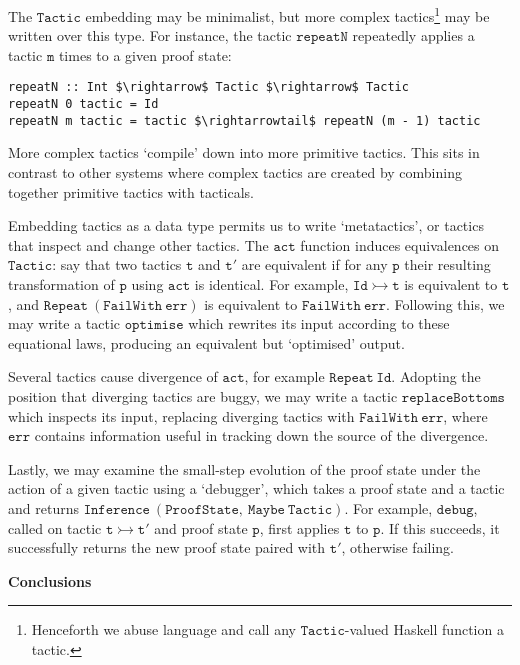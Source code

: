 \documentclass{llncs}
\begin{document}
The $\mathtt{Tactic}$ embedding may be minimalist, but more complex tactics\footnote{Henceforth we abuse language and call any $\mathtt{Tactic}$-valued Haskell function a tactic.} may be written over this type.
For instance, the tactic $\mathtt{repeatN}$ repeatedly applies a tactic $\mathtt{m}$ times to a given proof state:
\begin{lstlisting}
repeatN :: Int $\rightarrow$ Tactic $\rightarrow$ Tactic
repeatN 0 tactic = Id
repeatN m tactic = tactic $\rightarrowtail$ repeatN (m - 1) tactic
\end{lstlisting}

More complex tactics `compile' down into more primitive tactics.
This sits in contrast to other systems where complex tactics are created by combining together primitive tactics with tacticals.

Embedding tactics as a data type permits us to write `metatactics', or tactics that inspect and change other tactics.
The $\mathtt{act}$ function induces equivalences on $\mathtt{Tactic}$: say that two tactics $\mathtt{t}$ and $\mathtt{t'}$ are equivalent if for any $\mathtt{p}$ their resulting transformation of $\mathtt{p}$ using $\mathtt{act}$ is identical.
For example, $\mathtt{Id \rightarrowtail t}$ is equivalent to $\mathtt{t}$, and $\mathtt{Repeat\ (FailWith\ err)}$ is equivalent to $\mathtt{FailWith\ err}$.
Following this, we may write a tactic $\mathtt{optimise}$ which rewrites its input according to these equational laws, producing an equivalent but `optimised' output.

Several tactics cause divergence of $\mathtt{act}$, for example $\mathtt{Repeat\ Id}$.
Adopting the position that diverging tactics are buggy, we may write a tactic $\mathtt{replaceBottoms}$ which inspects its input, replacing diverging tactics with $\mathtt{FailWith\ err}$, where $\mathtt{err}$ contains information useful in tracking down the source of the divergence.

Lastly, we may examine the small-step evolution of the proof state under the action of a given tactic using a `debugger', which takes a proof state and a tactic and returns $\mathtt{Inference\ (ProofState,\ Maybe\ Tactic)}$.
For example, $\mathtt{debug}$, called on tactic $\mathtt{t \rightarrowtail t'}$ and proof state $\mathtt{p}$, first applies $\mathtt{t}$ to $\mathtt{p}$.
If this succeeds, it successfully returns the new proof state paired with $\mathtt{t'}$, otherwise failing.

\noindent\newline
\textbf{Conclusions}
\newline
\end{document}
